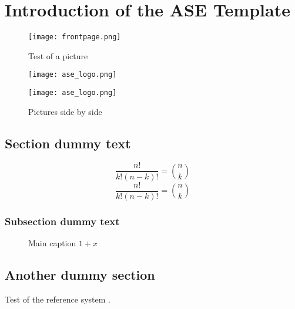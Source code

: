 \chapter{Introduction of the ASE Template}
\label{chap:f}
\lipsum[1]

\begin{figure}[htp]
  \centering
  \texttt{[image: frontpage.png]}
  \caption{Test of a picture}
  \label{fig:test}
\end{figure}

\lipsum[1]
\begin{figure}[ht]
  \begin{minipage}[htp]{0.48\linewidth}
    \centering
    \texttt{[image: ase\_logo.png]}
  \end{minipage}
  \hfill
  \begin{minipage}[htp]{0.48\linewidth}
    \centering
      \texttt{[image: ase\_logo.png]}
  \end{minipage}
    \caption{Pictures side by side}
  \label{fig:test1}
\end{figure}

\lipsum[1]

\section{Section dummy text}

\lipsum[1]

\[
 \frac{n!}{k!(n-k)!} = \binom{n}{k}
\]
\begin{equation}
  \frac{n!}{k!(n-k)!} = \binom{n}{k}
\end{equation}
\lipsum[1]

\subsection{Subsection dummy text}

\lipsum[1]

\begin{figure}
     \hfill
    \caption{Main caption $1+x$} 
\end{figure}

\lipsum[1]
\section{Another dummy section}

\lipsum

Test of the reference system \cite{Rabiner89}.